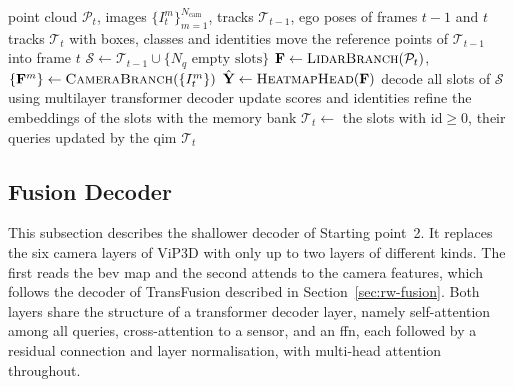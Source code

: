 \begin{algorithm}[htbp]
    \caption{Processing of one frame by \modelname at inference}
    \label{alg:design-frame}
    \begin{algorithmic}[1]
        \Require point cloud $\mathcal{P}_t$, images $\{I^m_t\}_{m=1}^{N_{\mathrm{cam}}}$, tracks
        $\mathcal{T}_{t-1}$, ego poses of frames $t-1$ and $t$
        \Ensure tracks $\mathcal{T}_t$ with boxes, classes and identities
        \State move the reference points of $\mathcal{T}_{t-1}$ into frame $t$ 
        \State $\mathcal{S} \gets \mathcal{T}_{t-1} \cup \{ N_q \text{ empty slots} \}$
        \State $\mathbf{F} \gets \Call{LidarBranch}{\mathcal{P}_t}$, \quad
        $\{\mathbf{F}^m\} \gets \Call{CameraBranch}{\{I^m_t\}}$
        \State $\hat{\mathbf{Y}} \gets \Call{HeatmapHead}{\mathbf{F}}$
        \State {} 
        \State decode all slots of $\mathcal{S}$ using multilayer transformer decoder 
        \State update scores and identities 
        \State refine the embeddings of the slots with the memory bank
        \State $\mathcal{T}_t \gets$ the slots with $\mathrm{id} \geq 0$, their queries updated by the \ac{qim}
        \State \Return $\mathcal{T}_t$
    \end{algorithmic}
\end{algorithm}


\subsection{Fusion Decoder}
\label{sec:design-decoder}

This subsection describes the shallower decoder of Starting point~2. It replaces the six
camera layers of ViP3D with only up to two layers of different kinds. The first reads the \ac{bev} map and the second
attends to the camera features, which follows the decoder of TransFusion \cite{Bai2022TransFusion} described
in Section~\ref{sec:rw-fusion}. Both layers share the structure of a transformer decoder layer, namely
self-attention among all queries, cross-attention to a sensor, and an \ac{ffn},
each followed by a residual connection and layer normalisation, with multi-head attention throughout.

